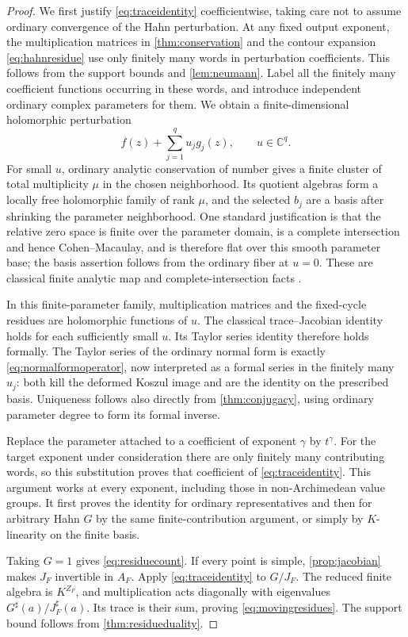 \documentclass[11pt]{article}
\theoremstyle{definition}
\newcommand{\C}{\mathbb C}
\newcommand{\sh}{^{\sharp}}
\begin{document}
\begin{proof}
We first justify \eqref{eq:traceidentity} coefficientwise, taking care not to assume ordinary convergence of the Hahn perturbation. At any fixed output exponent, the multiplication matrices in \cref{thm:conservation} and the contour expansion \eqref{eq:hahnresidue} use only finitely many words in perturbation coefficients. This follows from the support bounds and \cref{lem:neumann}. Label all the finitely many coefficient functions occurring in these words, and introduce independent ordinary complex parameters for them. We obtain a finite-dimensional holomorphic perturbation
\[
 f(z)+\sum_{j=1}^{q}u_jg_j(z),\qquad u\in\C^q.
\]
For small $u$, ordinary analytic conservation of number gives a finite cluster of total multiplicity $\mu$ in the chosen neighborhood. Its quotient algebras form a locally free holomorphic family of rank $\mu$, and the selected $b_j$ are a basis after shrinking the parameter neighborhood. One standard justification is that the relative zero space is finite over the parameter domain, is a complete intersection and hence Cohen--Macaulay, and is therefore flat over this smooth parameter base; the basis assertion follows from the ordinary fiber at $u=0$. These are classical finite analytic map and complete-intersection facts \cite{GR,GH,Stacks}.

In this finite-parameter family, multiplication matrices and the fixed-cycle residues are holomorphic functions of $u$. The classical trace--Jacobian identity holds for each sufficiently small $u$. Its Taylor series identity therefore holds formally. The Taylor series of the ordinary normal form is exactly \eqref{eq:normalformoperator}, now interpreted as a formal series in the finitely many $u_j$: both kill the deformed Koszul image and are the identity on the prescribed basis. Uniqueness follows also directly from \cref{thm:conjugacy}, using ordinary parameter degree to form its formal inverse.

Replace the parameter attached to a coefficient of exponent $\gamma$ by $t^\gamma$. For the target exponent under consideration there are only finitely many contributing words, so this substitution proves that coefficient of \eqref{eq:traceidentity}. This argument works at every exponent, including those in non-Archimedean value groups. It first proves the identity for ordinary representatives and then for arbitrary Hahn $G$ by the same finite-contribution argument, or simply by $K$-linearity on the finite basis.

Taking $G=1$ gives \eqref{eq:residuecount}. If every point is simple, \cref{prop:jacobian} makes $J_F$ invertible in $A_F$. Apply \eqref{eq:traceidentity} to $G/J_F$. The reduced finite algebra is $K^{Z_F}$, and multiplication acts diagonally with eigenvalues $G\sh(a)/J_F\sh(a)$. Its trace is their sum, proving \eqref{eq:movingresidues}. The support bound follows from \cref{thm:residueduality}.
\end{proof}
\end{document}

